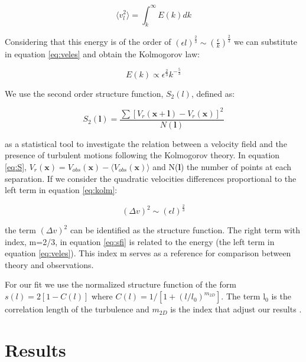 \documentclass[fleqn,usenatbib]{mnras}
\begin{document}
\begin{equation}\label{eq:veles}
 \langle v_{l}^{2} \rangle = \int_{k}^{\infty} E(k)dk
\end{equation}

Considering that this energy is of the order of $(\epsilon l)^{\frac{2}{3}} \sim (\frac{\epsilon}{k})^{\frac{2}{3}}$ we can substitute in equation \ref{eq:veles} and obtain the Kolmogorov law:

\begin{equation}\label{eq:kolm}
E(k) \propto \epsilon^\frac{2}{3} k^{-\frac{5}{3}}
\end{equation}

We use the second order structure function, $S_{2}(l)$, defined as:

\begin{equation}\label{eq:S}
S_{2}(\boldsymbol{l})=\dfrac{\sum[V_{r}(\boldsymbol{x}+\boldsymbol{l})-V_{r}(\boldsymbol{x}) ]^{2}}{N(\boldsymbol{l})}
\end{equation}

as a statistical tool to investigate the relation between a velocity field and the presence of turbulent motions following the Kolmogorov theory. In equation \ref{eq:S}, $V_{r}(\boldsymbol{x})= V_{obs}(\boldsymbol{x})-\langle V_{obs}(\boldsymbol{x}) \rangle$ and N($\boldsymbol{l}$) the number of points at each separation. If we consider the quadratic velocities differences proportional to the left term in equation \ref{eq:kolm}:

\begin{equation}\label{eq:sfi}
(\Delta v)^{2} \sim (\epsilon l)^{\frac{2}{3}}
\end{equation}

the term $(\Delta v)^{2}$ can be identified as the structure function. The right term with index,  m=2/3, in equation \ref{eq:sfi} is related to the energy (the left term in equation \ref{eq:veles}). This index m serves as a reference for comparison between theory and observations.

For our fit we use the normalized structure function of the form $s(l)=2[1-C(l)]$ where $C(l)=1/[1+(l/l_{0})^{m_{2D}}]$. The term l$_{0}$ is the correlation length of the turbulence and $m_{2D}$ is the index that adjust our results \citep{1984ApJ...277..556S, arthur2016turbulence}.


\section{Results}\label{sec:res}
\end{document}
